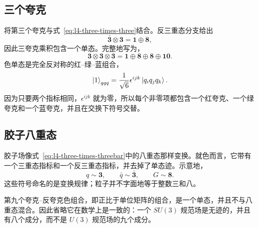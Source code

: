 \subsection{三个夸克}

将第三个夸克与式~\eqref{eq:l4-three-times-three}结合。反三重态分支给出
\begin{equation}
\bar{\boldsymbol 3}\otimes\boldsymbol 3
=\boldsymbol 1\oplus\boldsymbol 8,
\end{equation}
因此三夸克乘积包含一个单态。完整地写为，
\begin{equation}
\boldsymbol 3\otimes\boldsymbol 3\otimes\boldsymbol 3
=\boldsymbol 1\oplus\boldsymbol 8\oplus\boldsymbol 8
\oplus\boldsymbol{10}.
\label{eq:l4-three-quark-full}
\end{equation}
色单态是完全反对称的红--绿--蓝组合，
\begin{equation}
\left\lvert1\right\rangle_{qqq}
=\frac{1}{\sqrt6}\epsilon^{ijk}\left\lvert q_iq_jq_k\right\rangle.
\label{eq:l4-baryon-singlet}
\end{equation}
因为只要两个指标相同，\(\epsilon^{ijk}\) 就为零，所以每个非零项都包含一个红夸克、一个绿夸克和一个蓝夸克，并且在交换下符号交替。

\begin{classroomqa}
\end{classroomqa}

\subsection{胶子八重态}

胶子场像式~\eqref{eq:l4-three-times-threebar}中的八重态那样变换。就色而言，它带有一个三重态指标和一个反三重态指标，并去掉了单态迹。示意地，
\begin{equation}
q\sim\boldsymbol 3,
\qquad
\bar q\sim\bar{\boldsymbol 3},
\qquad
G\sim\boldsymbol 8.
\end{equation}
这些符号命名的是变换规律；粒子并不字面地等于整数三和八。

第九个夸克--反夸克色组合，即正比于单位矩阵的组合，是一个单态，并且不与八重态混合。因此省略它在数学上是一致的：一个 \(SU(3)\) 规范场是无迹的，并且有八个成分，而不是 \(U(3)\) 规范场的九个成分。

\begin{classroomqa}
\end{classroomqa}

